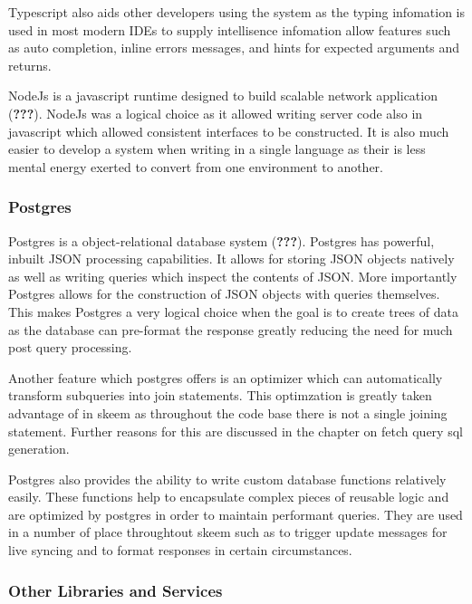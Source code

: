 \documentclass[
  12pt,
]{article}
\begin{document}
Typescript also aids other developers using the system as the typing
infomation is used in most modern IDEs to supply intellisence infomation
allow features such as auto completion, inline errors messages, and
hints for expected arguments and returns.

NodeJs is a javascript runtime designed to build scalable network
application ({\textbf{???}}). NodeJs was a logical choice as it allowed
writing server code also in javascript which allowed consistent
interfaces to be constructed. It is also much easier to develop a system
when writing in a single language as their is less mental energy exerted
to convert from one environment to another.

\hypertarget{postgres}{%
\subsubsection{Postgres}\label{postgres}}

Postgres is a object-relational database system ({\textbf{???}}).
Postgres has powerful, inbuilt JSON processing capabilities. It allows
for storing JSON objects natively as well as writing queries which
inspect the contents of JSON. More importantly Postgres allows for the
construction of JSON objects with queries themselves. This makes
Postgres a very logical choice when the goal is to create trees of data
as the database can pre-format the response greatly reducing the need
for much post query processing.

Another feature which postgres offers is an optimizer which can
automatically transform subqueries into join statements. This
optimzation is greatly taken advantage of in skeem as throughout the
code base there is not a single joining statement. Further reasons for
this are discussed in the chapter on fetch query sql generation.

Postgres also provides the ability to write custom database functions
relatively easily. These functions help to encapsulate complex pieces of
reusable logic and are optimized by postgres in order to maintain
performant queries. They are used in a number of place throughtout skeem
such as to trigger update messages for live syncing and to format
responses in certain circumstances.

\hypertarget{other-libraries-and-services}{%
\subsubsection{Other Libraries and
Services}\label{other-libraries-and-services}}
\end{document}
